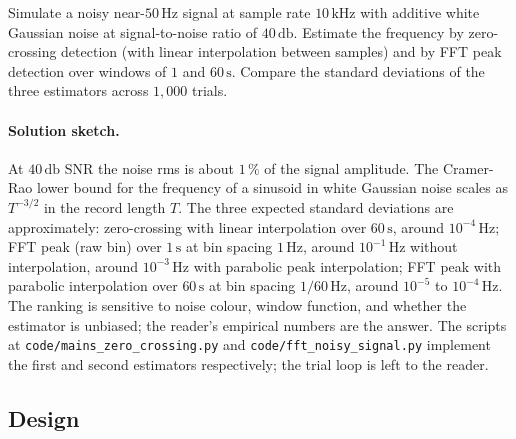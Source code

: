 \begin{exercise}
Simulate a noisy near-$50 \,\si{\hertz}$ signal at sample rate
$10 \,\si{\kilo\hertz}$ with additive white Gaussian noise at
signal-to-noise ratio of $40 \,\si{\decibel}$. Estimate the
frequency by zero-crossing detection (with linear interpolation
between samples) and by FFT peak detection over windows of $1$ and
$60 \,\si{\second}$. Compare the standard deviations of the three
estimators across $1{,}000$ trials.

\paragraph{Solution sketch.}
At $40 \,\si{\decibel}$ SNR the noise rms is about $1\,\%$ of the
signal amplitude. The Cramer-Rao lower bound for the frequency
of a sinusoid in white Gaussian noise scales as $T^{-3/2}$ in the
record length $T$. The three expected standard deviations are
approximately: zero-crossing with linear interpolation over $60
\,\si{\second}$, around $10^{-4} \,\si{\hertz}$; FFT peak (raw bin)
over $1 \,\si{\second}$ at bin spacing $1 \,\si{\hertz}$, around
$10^{-1} \,\si{\hertz}$ without interpolation, around $10^{-3} \,
\si{\hertz}$ with parabolic peak interpolation; FFT peak with
parabolic interpolation over $60 \,\si{\second}$ at bin spacing
$1/60 \,\si{\hertz}$, around $10^{-5}$ to $10^{-4} \,\si{\hertz}$.
The ranking is sensitive to noise colour, window function, and
whether the estimator is unbiased; the reader's empirical numbers
are the answer. The scripts at \texttt{code/mains\_zero\_crossing.py}
and \texttt{code/fft\_noisy\_signal.py} implement the first and
second estimators respectively; the trial loop is left to the
reader.
\end{exercise}

\subsection*{Design}

